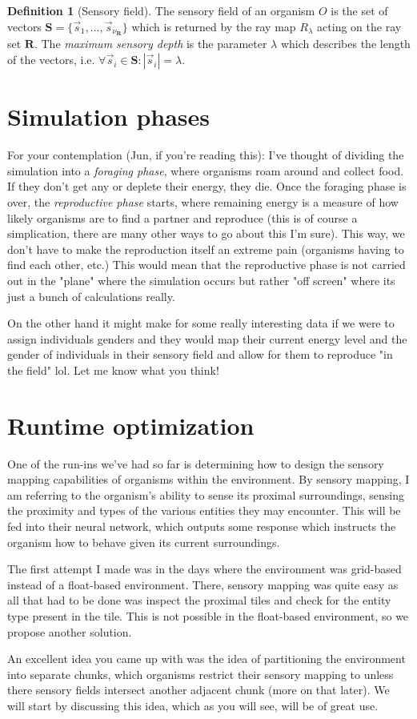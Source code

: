 \documentclass[a4paper, 12pt]{report}
\theoremstyle{definition}
\newtheorem{definition}{Definition}
\begin{document}
\begin{definition}[Sensory field]
    The sensory field of an organism $O$ is the set of vectors $\mathbf S = \{\vec{s}_1, \ldots, \vec{s}_{\nu_{\mathbf R}}\}$ which is returned by the ray map $R_\lambda$ acting on the
    ray set $\mathbf R$. The \emph{maximum sensory depth} is the parameter $\lambda$ which describes the length of the vectors, i.e. $\forall \vec{s}_i \in \mathbf S: |\vec{s}_i| = \lambda$.
\end{definition}

\section{Simulation phases}
For your contemplation (Jun, if you're reading this): I've thought of dividing the simulation into a \emph{foraging phase}, where organisms roam around and collect food.
If they don't get any or deplete their energy, they die. Once the foraging phase is over, the \emph{reproductive phase} starts, where remaining energy is a measure of how
likely organisms are to find a partner and reproduce (this is of course a simplication, there are many other ways to go about this I'm sure). This way, we don't have to make
the reproduction itself an extreme pain (organisms having to find each other, etc.) This would mean that the reproductive phase is not carried out in the "plane" where the simulation
occurs but rather "off screen" where its just a bunch of calculations really.
\par On the other hand it might make for some really interesting data if we were to assign individuals genders and they would map their current energy level and the gender of individuals
in their sensory field and allow for them to reproduce "in the field" lol. Let me know what you think!



\section{Runtime optimization}
One of the run-ins we've had so far is determining how to design the sensory mapping capabilities of organisms within the environment. By sensory mapping, I am referring to the organism's ability to sense its
proximal surroundings, sensing the proximity and types of the various entities they may encounter. This will be fed into their neural network, which outputs some response which instructs the organism how to behave
given its current surroundings.
\par The first attempt I made was in the days where the environment was grid-based instead of a float-based environment. There, sensory mapping was quite easy as all that had to be done was inspect the proximal tiles
and check for the entity type present in the tile. This is not possible in the float-based environment, so we propose another solution.
\par An excellent idea you came up with was the idea of partitioning the environment into separate chunks, which organisms restrict their sensory mapping to unless there sensory fields intersect another adjacent chunk
(more on that later). We will start by discussing this idea, which as you will see, will be of great use.
\end{document}
